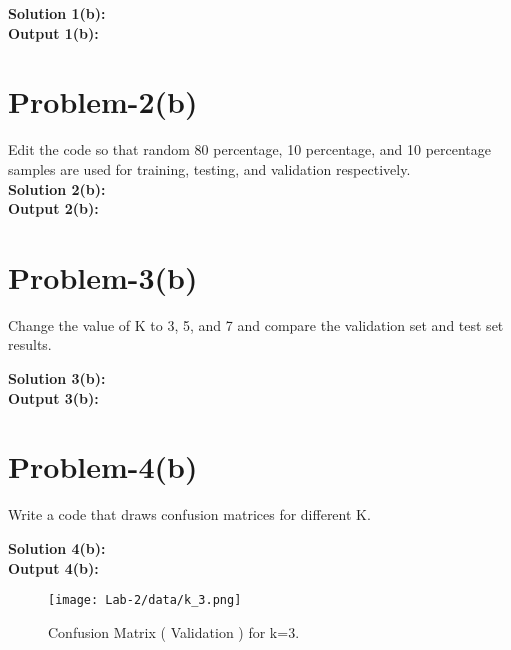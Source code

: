 \textbf{Solution 1(b): }
\\

\textbf{Output 1(b): }
\\




\section{Problem-2(b)}
Edit the code so that random 80 percentage, 10 percentage, and 10 percentage samples are used for training, testing, and validation respectively.\\

\textbf{Solution 2(b): }
\\

\textbf{Output 2(b): }
\\

\section{Problem-3(b)}
Change the value of K to 3, 5, and 7 and compare the validation set and test set results.

\textbf{Solution 3(b): }
\\

\textbf{Output 3(b): }
\\

\section{Problem-4(b)}
Write a code that draws confusion matrices for different K.

\textbf{Solution 4(b): }
\\

\textbf{Output 4(b): }
\\

\begin{figure}[ht]
\centering
\texttt{[image: Lab-2/data/k\_3.png]}
\caption{Confusion Matrix ( Validation ) for k=3.}
\label{fig:sample}
\end{figure}

